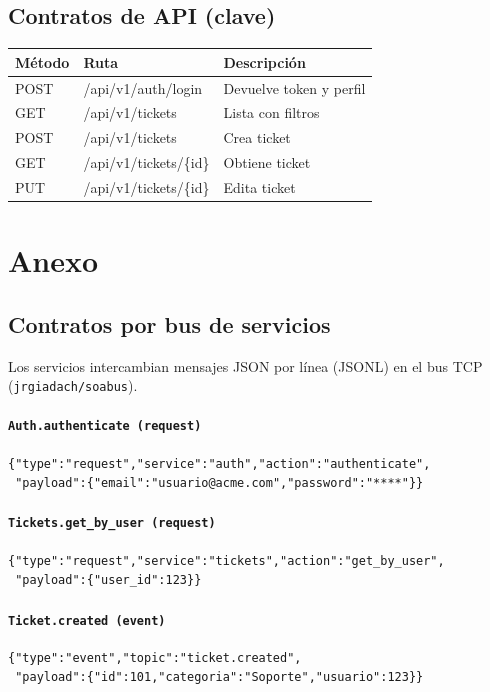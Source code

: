 \documentclass[letter,12pt]{article}
\begin{document}
\subsection*{Contratos de API (clave)}
\begin{tabular}{|l|l|l|}
\hline
\textbf{Método} & \textbf{Ruta} & \textbf{Descripción} \\
\hline
POST & /api/v1/auth/login & Devuelve token y perfil \\
GET  & /api/v1/tickets & Lista con filtros \\
POST & /api/v1/tickets & Crea ticket \\
GET  & /api/v1/tickets/\{id\} & Obtiene ticket \\
PUT  & /api/v1/tickets/\{id\} & Edita ticket \\
\hline
\end{tabular}



\section{Anexo}
\subsection*{Contratos por bus de servicios}
Los servicios intercambian mensajes JSON por línea (JSONL) en el bus TCP (\texttt{jrgiadach/soabus}).

\paragraph{\texttt{Auth.authenticate (request)}}
\begin{verbatim}
{"type":"request","service":"auth","action":"authenticate",
 "payload":{"email":"usuario@acme.com","password":"****"}}
\end{verbatim}

\paragraph{\texttt{Tickets.get\_by\_user (request)}}
\begin{verbatim}
{"type":"request","service":"tickets","action":"get_by_user",
 "payload":{"user_id":123}}
\end{verbatim}

\paragraph{\texttt{Ticket.created (event)}}
\begin{verbatim}
{"type":"event","topic":"ticket.created",
 "payload":{"id":101,"categoria":"Soporte","usuario":123}}
\end{verbatim}
\end{document}
